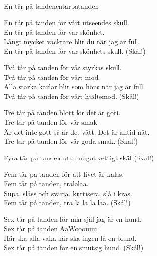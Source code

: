 \begin{song}{En tår på tanden}{entarpatanden}
\begin{vers}
En tår på tanden för vårt utseendes skull.\\
En tår på tanden för vår skönhet.\\
Långt mycket vackrare blir du när jag är full.\\
En tår på tanden för vår skönhets skull. (Skål!)\\

\end{vers}
\begin{vers}

Två tår på tanden för vår styrkas skull.\\
Två tår på tanden för vårt mod.\\
Alla starka karlar blir som höns när jag är full.\\
Två tår på tanden för vårt hjältemod. (Skål!)\\

\end{vers}
\begin{vers}

Tre tår på tanden blott för det är gott.\\
Tre tår på tanden för vår smak.\\
Är det inte gott så är det vått. Det är alltid nåt.\\
Tre tår på tanden för vår goda smak. (Skål!)\\

\end{vers}
\begin{vers}

Fyra tår på tanden utan något vettigt skäl (Skål!)\\

\end{vers}
\begin{vers}

Fem tår på tanden för att livet är kalas.\\
Fem tår på tanden, tralalaa.\\
Supa, slåss och svärja, kurtisera, slå i kras.\\
Fem tår på tanden, tra la la la laa. (Skål!)\\

\end{vers}
\begin{vers}

Sex tår på tanden för min själ jag är en hund.\\
Sex tår på tanden AaWooouuu!\\
Här ska alla vaka här ska ingen få en blund.\\
Sex tår på tanden för en smutsig hund. (Skål!)\\


\end{vers}
\end{song}
